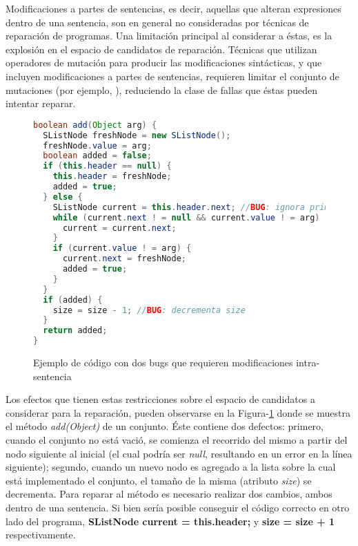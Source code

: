 Modificaciones a partes de sentencias, es decir, aquellas que alteran expresiones dentro de una sentencia, son en general no consideradas por t\'ecnicas de reparaci\'on de programas. Una limitaci\'on principal al considerar a \'estas, es la explosi\'on en el espacio de candidatos de reparaci\'on. T\'ecnicas que utilizan operadores de mutaci\'on para producir las modificaciones sint\'acticas, y que incluyen modificaciones a partes de sentencias, requieren limitar el conjunto de mutaciones (por ejemplo, \cite{bibliography.repair.GopinathMK11}), reduciendo la clase de fallas que \'estas pueden intentar reparar.

\begin{figure}
\begin{lstlisting}[mathescape=true, language=Java,basicstyle=\footnotesize]
boolean add(Object arg) {
  SListNode freshNode = new SListNode();
  freshNode.value = arg;
  boolean added = false;
  if (this.header == null) {
    this.header = freshNode;
    added = true;
  } else {
    SListNode current = this.header.next; //BUG: ignora primer nodo
    while (current.next ! = null && current.value ! = arg) {
      current = current.next;
    }
    if (current.value ! = arg) {
      current.next = freshNode;
      added = true;
    }
  }
  if (added) {
    size = size - 1; //BUG: decrementa size
  }
  return added;
}
\end{lstlisting}
\caption{Ejemplo de c\'odigo con dos bugs que requieren modificaciones intra-sentencia}
\label{figures.examples.repair.exampleCode}
\end{figure}

Los efectos que tienen estas restricciones sobre el espacio de candidatos a considerar para la reparaci\'on, pueden observarse en la Figura-\ref{figures.examples.repair.exampleCode} donde se muestra el m\'etodo \emph{add(Object)} de un conjunto. \'Este contiene dos defectos: primero, cuando el conjunto no est\'a vaci\'o, se comienza el recorrido del mismo a partir del nodo siguiente al inicial (el cual podr\'ia ser \emph{null}, resultando en un error en la l\'inea siguiente); segundo, cuando un nuevo nodo es agregado a la lista sobre la cual est\'a implementado el conjunto, el tama\~no de la misma (atributo \emph{size}) se decrementa. Para reparar al m\'etodo es necesario realizar dos cambios, ambos dentro de una sentencia. Si bien ser\'ia posible conseguir el c\'odigo correcto en otro lado del programa, \textbf{SListNode current = this.header;} y \textbf{size = size + 1} respectivamente.



